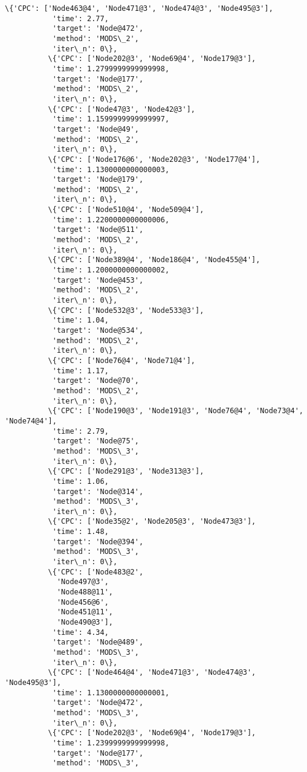 \documentclass[11pt]{article}
\begin{document}
\begin{Verbatim}[commandchars=\\\{\}]
          \{'CPC': ['Node463@4', 'Node471@3', 'Node474@3', 'Node495@3'],
           'time': 2.77,
           'target': 'Node@472',
           'method': 'MODS\_2',
           'iter\_n': 0\},
          \{'CPC': ['Node202@3', 'Node69@4', 'Node179@3'],
           'time': 1.2799999999999998,
           'target': 'Node@177',
           'method': 'MODS\_2',
           'iter\_n': 0\},
          \{'CPC': ['Node47@3', 'Node42@3'],
           'time': 1.1599999999999997,
           'target': 'Node@49',
           'method': 'MODS\_2',
           'iter\_n': 0\},
          \{'CPC': ['Node176@6', 'Node202@3', 'Node177@4'],
           'time': 1.1300000000000003,
           'target': 'Node@179',
           'method': 'MODS\_2',
           'iter\_n': 0\},
          \{'CPC': ['Node510@4', 'Node509@4'],
           'time': 1.2200000000000006,
           'target': 'Node@511',
           'method': 'MODS\_2',
           'iter\_n': 0\},
          \{'CPC': ['Node389@4', 'Node186@4', 'Node455@4'],
           'time': 1.2000000000000002,
           'target': 'Node@453',
           'method': 'MODS\_2',
           'iter\_n': 0\},
          \{'CPC': ['Node532@3', 'Node533@3'],
           'time': 1.04,
           'target': 'Node@534',
           'method': 'MODS\_2',
           'iter\_n': 0\},
          \{'CPC': ['Node76@4', 'Node71@4'],
           'time': 1.17,
           'target': 'Node@70',
           'method': 'MODS\_2',
           'iter\_n': 0\},
          \{'CPC': ['Node190@3', 'Node191@3', 'Node76@4', 'Node73@4', 'Node74@4'],
           'time': 2.79,
           'target': 'Node@75',
           'method': 'MODS\_3',
           'iter\_n': 0\},
          \{'CPC': ['Node291@3', 'Node313@3'],
           'time': 1.06,
           'target': 'Node@314',
           'method': 'MODS\_3',
           'iter\_n': 0\},
          \{'CPC': ['Node35@2', 'Node205@3', 'Node473@3'],
           'time': 1.48,
           'target': 'Node@394',
           'method': 'MODS\_3',
           'iter\_n': 0\},
          \{'CPC': ['Node483@2',
            'Node497@3',
            'Node488@11',
            'Node456@6',
            'Node451@11',
            'Node490@3'],
           'time': 4.34,
           'target': 'Node@489',
           'method': 'MODS\_3',
           'iter\_n': 0\},
          \{'CPC': ['Node464@4', 'Node471@3', 'Node474@3', 'Node495@3'],
           'time': 1.1300000000000001,
           'target': 'Node@472',
           'method': 'MODS\_3',
           'iter\_n': 0\},
          \{'CPC': ['Node202@3', 'Node69@4', 'Node179@3'],
           'time': 1.2399999999999998,
           'target': 'Node@177',
           'method': 'MODS\_3',

\end{Verbatim}
\end{document}

